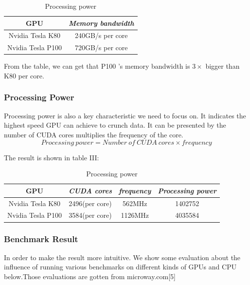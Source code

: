 \documentclass[conference]{IEEEtran}
\begin{document}
\begin{table}[H]
\caption{Processing power}
\begin{center}
\begin{tabular}{|c|c|}
\hline
\textbf{GPU} & \textbf{\textit{Memory bandwidth}}\\
\hline
Nvidia Tesla K80 & 240GB/s per core \\
\hline
Nvidia Tesla P100 & 720GB/s per core\\
\hline
\end{tabular}
\end{center}
\end{table}


From the table, we can get that P100 's memory bandwidth is $3 \times$ bigger than K80 per core. 

\subsubsection{Processing Power}
Processing power is also a key characteristic we need to focus on. It indicates the highest speed GPU can achieve to crunch data. It can be presented by the number of CUDA cores multiplies the frequency of the core.
$$Processing \ power = Number \ of \ CUDA \ cores \times frequency $$

The result is shown in table III:

\begin{table}[H]
\caption{Processing power}
\begin{center}
\begin{tabular}{|c|c|c|c|}
\hline
\textbf{GPU} & \textbf{\textit{CUDA cores}}& \textbf{\textit{frequency}}& \textbf{\textit{Processing power}} \\
\hline
Nvidia Tesla K80 & 2496(per core)& 562MHz & 1402752 \\
\hline
Nvidia Tesla P100 & 3584(per core)& 1126MHz & 4035584 \\
\hline
\end{tabular}
\label{tab2}
\end{center}
\end{table}

\subsubsection{Benchmark Result}

In order to make the result more intuitive. We show some evaluation about the influence of running various benchmarks on different kinds of GPUs and CPU below.Those evaluations are gotten from microway.com[5]
\end{document}
